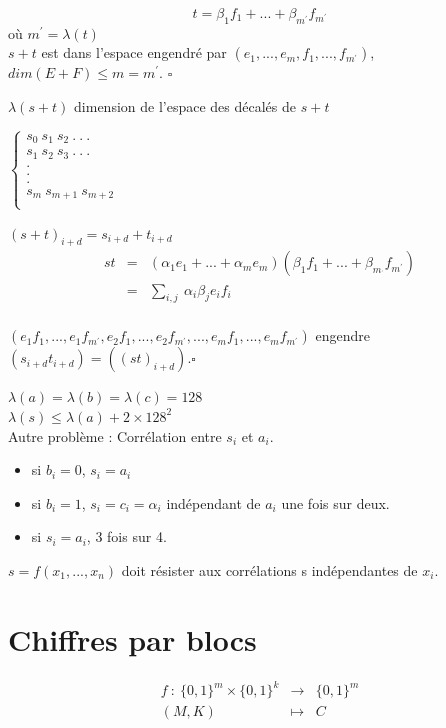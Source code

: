 \documentclass[12pt,a4paper]{article}
\begin{document}
\medskip

$$t=\beta_1f_1+...+\beta_{m^{'}}f_{m^{'}}$$
où $m^{'}=\lambda(t)$\\
$s+t$ est dans l'espace engendré par $(e_1,...,e_m,f_1,...,f_{m^{'}})$, $dim(E+F)\leq m=m^{'}$. 
 $\square$
 
\medskip
 
$\lambda(s+t)$ dimension de l'espace des décalés de $s+t$

$\left\lbrace
\begin{array}{ll}
	s_0\ s_1\ s_2\ .\ .\ .\\
	s_1\ s_2\ s_3\ .\ .\ .\\
	. \\
	. \\
	. \\
	s_m\ s_{m+1}\ s_{m+2}\\
\end{array}
\right.$
 
$(s+t)_{i+d} = s_{i+d}+t_{i+d}$ \\
\begin{eqnarray*}
st &=&  (\alpha_1  e_1 +...+ \alpha_m e_m) ( \beta_1 f_1 +...+ \beta_{m_{^{'}}} f_{m^{'}}) \\
   &=& \sum_{i,j}\ \alpha_i \beta_j e_i f_i \\ 
\end{eqnarray*}

$(e_1 f_1 ,..., e_1 f_{m^{'}}, e_2 f_1, ..., e_2 f_{m^{'}}, ..., e_m f_1, ..., e_m f_{m^{'}})$ engendre $(s_{i+d} t_{i+d}) = ((st)_{i+d}). \square $

\medskip
\hspace*{-0,6cm}$\lambda(a) = \lambda(b) = \lambda(c) = 128$\\
$\lambda(s) \leq \lambda(a) + 2\times 128^2$\\

\medskip
Autre problème : Corrélation entre $s_i$ et $a_i$.
\begin{itemize}
\item si $b_i = 0$, $s_i = a_i$
\item si $b_i = 1$, $s_i = c_i = \alpha_i$ indépendant de $a_i$ une fois sur deux.
\item si $s_i = a_i$, 3 fois sur 4.
\end{itemize}

$s=f(x_1,...,x_n)$ doit résister aux corrélations s indépendantes de $x_i$.\\

\section{Chiffres par blocs}
\begin{eqnarray*}
f\ :\ \{0,1\}^m \times \{0,1\}^k &\longrightarrow & \{0,1\}^m \\
(M, K) & \longmapsto & C \\
\end{eqnarray*}
\end{document}
